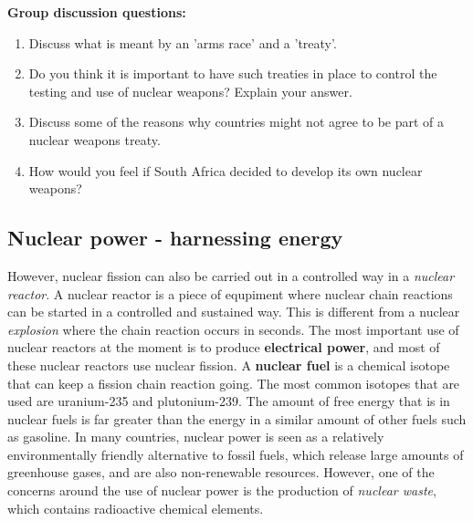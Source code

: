{\textbf{Group discussion questions:\\}

\begin{enumerate}
\item{Discuss what is meant by an 'arms race' and a 'treaty'.}
\item{Do you think it is important to have such treaties in place to control the testing and use of nuclear weapons? Explain your answer.}
\item{Discuss some of the reasons why countries might not agree to be part of a nuclear weapons treaty.}
\item{How would you feel if South Africa decided to develop its own nuclear weapons?}
\end{enumerate}
}

\subsection{Nuclear power - harnessing energy}
\label{subsec:an:nfiss:power}

However, nuclear fission can also be carried out in a controlled way in a \textit{nuclear reactor}. A nuclear reactor is a piece of equpiment where nuclear chain reactions can be started in a controlled and sustained way. This is different from a nuclear \textit{explosion} where the chain reaction occurs in seconds. The most important use of nuclear reactors at the moment is to produce \textbf{electrical power}, and most of these nuclear reactors use nuclear fission. A \textbf{nuclear fuel} is a chemical isotope that can keep a fission chain reaction going. The most common isotopes that are used are uranium-235 and plutonium-239. The amount of free energy that is in nuclear fuels is far greater than the energy in a similar amount of other fuels such as gasoline. In many countries, nuclear power is seen as a relatively environmentally friendly alternative to fossil fuels, which release large amounts of greenhouse gases, and are also non-renewable resources. However, one of the concerns around the use of nuclear power is the production of \textit{nuclear waste}, which contains radioactive chemical elements.

